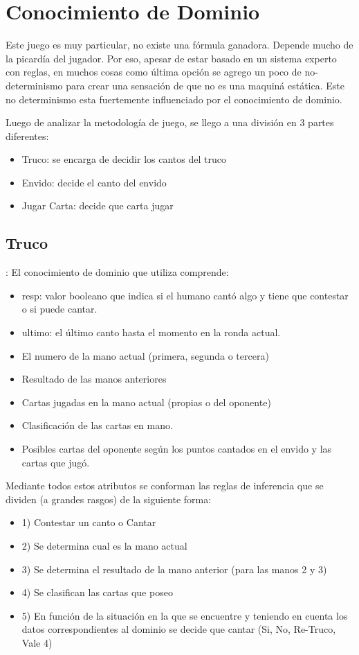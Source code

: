 \documentclass[12pt,a4paper]{article}
\begin{document}
\section{Conocimiento de Dominio}

Este juego es muy particular, no existe una f\'ormula ganadora. Depende mucho de la picard\'ia del jugador. Por eso, apesar de estar basado en un sistema experto
con reglas, en muchos cosas como \'ultima opci\'on se agrego un poco de no-determinismo para crear una sensaci\'on  de que no es una maquin\'a est\'atica. 
Este no determinismo esta fuertemente influenciado por el conocimiento de dominio.

Luego de analizar la metodolog\'ia de juego, se llego a una divisi\'on en 3 partes diferentes:
\begin{itemize}
\item Truco: se encarga de decidir los cantos del truco
\item Envido: decide el canto del envido
\item Jugar Carta: decide que carta jugar
\end{itemize}
 

\subsection{Truco}:
El conocimiento de dominio que utiliza comprende:
\begin{itemize}
\item resp: valor booleano que indica si el humano cantó algo y tiene que contestar o si puede cantar.
\item ultimo: el último canto hasta el momento en la ronda actual.
\item El numero de la mano actual (primera, segunda o tercera)
\item Resultado de las manos anteriores
\item Cartas jugadas en la mano actual (propias o del oponente)
\item Clasificación de las cartas en mano.
\item Posibles cartas del oponente según los puntos cantados en el envido y las cartas que jugó.
\end{itemize}

Mediante todos estos atributos se conforman las reglas de inferencia que se dividen (a grandes rasgos) de la 
siguiente forma:

\begin{itemize}
\item 1) Contestar un canto o Cantar
\item 2) Se determina cual es la mano actual
\item 3) Se determina el resultado de la mano anterior (para las manos 2 y 3)
\item 4) Se clasifican las cartas que poseo
\item 5) En función de la situación en la que se encuentre y teniendo en cuenta los datos correspondientes al dominio
	   se decide que cantar (Si, No, Re-Truco, Vale 4)
\end{itemize}
\end{document}
